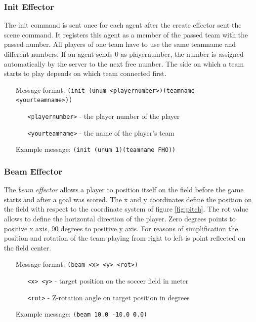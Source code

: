 \subsubsection{Init Effector}
\label{sec:initeffector}
The init command is sent once for each agent after the create effector sent the
scene command. It registers this agent as a member of the passed team with the passed number.
All players of one team have to use the same teamname and different numbers.
If an agent sends 0 as playernumber, the number is assigned automatically by
the server to the next free number.
The side on which a team starts to play depends on which team connected first.
\begin{itemize}
	\item[Message format:] \texttt{(init (unum <playernumber>)(teamname
	<yourteamname>))}
		\begin{itemize}
		  \item[\texttt{<playernumber>} -] the player number of the player
		  \item[\texttt{<yourteamname>} -] the name of the player's team
		\end{itemize}
	\item[Example message:] \texttt{(init (unum 1)(teamname FHO))}
\end{itemize}



\subsubsection{Beam Effector}
\label{sec:beameffector}
The \emph{beam effector} allows a player to position itself on the field before
the game starts and after a goal was scored. The x and y coordinates define the
position on the field with respect to the coordinate system of figure
\ref{fig:pitch}. The rot value allows to define the horizontal direction of the
player. Zero degrees points to positive x axis, 90 degrees to positive y axis.
For reasons of simplification the position and rotation of the team playing from
right to left is point reflected on the field center.
\begin{itemize}
	\item[Message format:] \texttt{(beam <x> <y> <rot>)}
		\begin{itemize}
		  \item[\texttt{<x> <y>} -] target position on the soccer field in meter
		  \item[\texttt{<rot>} -] Z-rotation angle on target position in degrees
		\end{itemize}
	\item[Example message:] \texttt{(beam 10.0 -10.0 0.0)}
\end{itemize}



